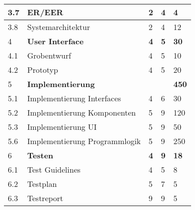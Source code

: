 \begin{tabular}{ | l | p{8cm} | p{2cm}|p{2cm}|p{2cm}|}
\hline
3.7 &ER/EER                            &2 &4 & 4 \\
\hline
3.8 &Systemarchitektur                 &2 &4 & 12 \\
\hline
4 &\textbf{User Interface}                   &\textbf{4} &\textbf{5} & \textbf{30} \\
\hline
4.1 &Grobentwurf                       &4 &5 & 10 \\
\hline
4.2 &Prototyp                          &4 &5 & 20 \\
\hline
5 &\textbf{Implementierung}                 & & & \textbf{450} \\
\hline
5.1 &Implementierung Interfaces        &4 &6 & 30 \\
\hline
5.2 &Implementierung Komponenten       &5 &9 & 120 \\
\hline
5.3 &Implementierung UI                &5 &9 & 50 \\
\hline
5.6 &Implementierung Programmlogik     &5 &9 & 250 \\
\hline
6 &\textbf{Testen}                           &\textbf{4} &\textbf{9} & \textbf{18} \\
\hline
6.1 &Test Guidelines                   &4 &5 & 8 \\
\hline
6.2 &Testplan                          &5 &7 & 5 \\
\hline
6.3 &Testreport                        &9 &9 & 5 \\
\hline
\end{tabular}

